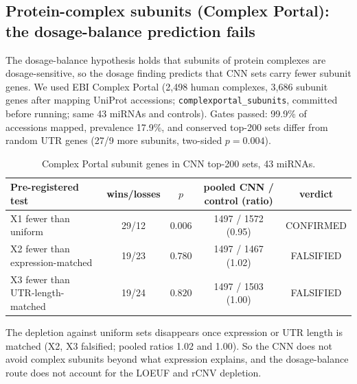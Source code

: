 \subsection{Protein-complex subunits (Complex Portal): the dosage-balance prediction fails}
The dosage-balance hypothesis holds that subunits of protein complexes are dosage-sensitive, so the dosage finding predicts that CNN sets carry fewer subunit genes. We used EBI Complex Portal (2,498 human complexes, 3,686 subunit genes after mapping UniProt accessions; \texttt{complexportal\_subunits}, committed before running; same 43 miRNAs and controls). Gates passed: 99.9\% of accessions mapped, prevalence 17.9\%, and conserved top-200 sets differ from random UTR genes (27/9 more subunits, two-sided $p=0.004$).
\begin{table}[h]\centering\small\begin{tabular}{lcccc}\hline Pre-registered test & wins/losses & $p$ & pooled CNN / control (ratio) & verdict\\\hline
X1 fewer than uniform & 29/12 & $0.006$ & 1497 / 1572 (0.95) & CONFIRMED \\
X2 fewer than expression-matched & 19/23 & $0.780$ & 1497 / 1467 (1.02) & FALSIFIED \\
X3 fewer than UTR-length-matched & 19/24 & $0.820$ & 1497 / 1503 (1.00) & FALSIFIED \\
\hline\end{tabular}\caption{Complex Portal subunit genes in CNN top-200 sets, 43 miRNAs.}\label{tab:complexportal}\end{table}
The depletion against uniform sets disappears once expression or UTR length is matched (X2, X3 falsified; pooled ratios 1.02 and 1.00). So the CNN does not avoid complex subunits beyond what expression explains, and the dosage-balance route does not account for the LOEUF and rCNV depletion.
